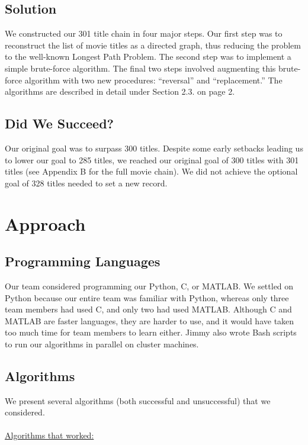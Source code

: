\documentclass[11pt,english]{article}
\begin{document}
\subsection{Solution}
We constructed our 301 title chain in four major steps. Our first step was to
reconstruct the list of movie titles as a directed graph, thus reducing the
problem to the well-known Longest Path Problem. The second step was to
implement a simple brute-force algorithm. The final two steps involved
augmenting this brute-force algorithm with two new procedures: ``reversal'' and
``replacement.'' The algorithms are described in detail under Section 2.3. on
page 2.

\subsection{Did We Succeed?}
Our original goal was to surpass 300 titles. Despite some early setbacks
leading us to lower our goal to 285 titles, we reached our original goal of 300
titles with 301 titles (see Appendix B for the full movie chain). We did not
achieve the optional goal of 328 titles needed to set a new record.

\section{Approach}

%
\subsection{Programming Languages}
Our team considered programming our Python, C, or MATLAB. We
settled on Python because our entire team was familiar with Python, whereas
only three team members had used C, and only two had used MATLAB. Although C
and MATLAB are faster languages, they are harder to use, and it would have
taken too much time for team members to learn either. Jimmy also wrote Bash
scripts to run our algorithms in parallel on cluster machines.

\subsection{Algorithms}
We present several algorithms (both successful and unsuccessful) that we
considered.\\\\
\underline{Algorithms that worked:}
\end{document}
